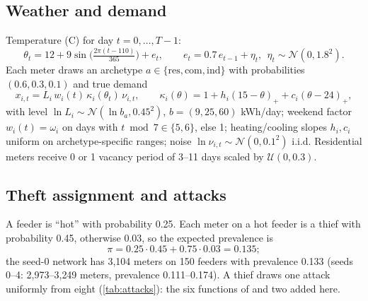 \documentclass[11pt,a4paper]{article}
\theoremstyle{plain}
\theoremstyle{definition}
\theoremstyle{remark}
\begin{document}
\subsection{Weather and demand}
Temperature (\textdegree C) for day $t=0,\dots,T-1$:
\begin{equation}
\theta_t=12+9\sin\!\Big(\tfrac{2\pi(t-110)}{365}\Big)+e_t,\qquad e_t=0.7\,e_{t-1}+\eta_t,\ \ \eta_t\sim\mathcal N(0,1.8^2).
\end{equation}
Each meter draws an archetype $a\in\{\text{res},\text{com},\text{ind}\}$ with probabilities $(0.6,0.3,0.1)$ and true demand
\begin{equation}
x_{i,t}=L_i\,w_i(t)\,\kappa_i(\theta_t)\,\nu_{i,t},\qquad
\kappa_i(\theta)=1+h_i(15-\theta)_+ + c_i(\theta-24)_+,
\end{equation}
with level $\ln L_i\sim\mathcal N(\ln b_a,0.45^2)$, $b=(9,25,60)$ kWh/day; weekend factor $w_i(t)=\omega_i$ on days with $t\bmod7\in\{5,6\}$, else 1; heating/cooling slopes $h_i,c_i$ uniform on archetype-specific ranges; noise $\ln\nu_{i,t}\sim\mathcal N(0,0.1^2)$ i.i.d. Residential meters receive 0 or 1 vacancy period of 3--11 days scaled by $\mathcal U(0,0.3)$.

\subsection{Theft assignment and attacks}
A feeder is ``hot'' with probability 0.25. Each meter on a hot feeder is a thief with probability 0.45, otherwise 0.03, so the expected prevalence is
\begin{equation}
\pi=0.25\cdot0.45+0.75\cdot0.03=0.135 ;
\end{equation}
the seed-0 network has 3{,}104 meters on 150 feeders with prevalence 0.133 (seeds 0--4: 2{,}973--3{,}249 meters, prevalence 0.111--0.174). A thief draws one attack uniformly from eight (\cref{tab:attacks}): the six functions of \citet{jokar2016} and two added here.
\end{document}
